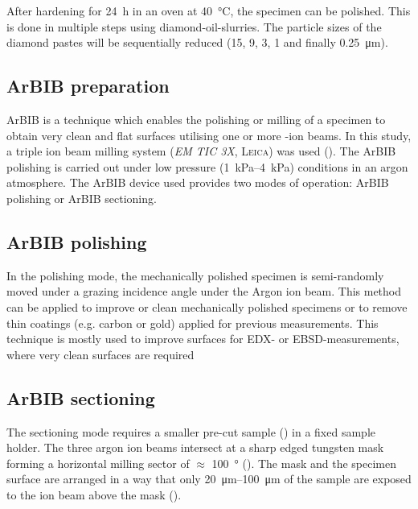 After hardening for \qty{24}{\hour} in an oven at \qty{40}{\celsius}, the specimen can be polished.
This is done in multiple steps using diamond-oil-slurries.
The particle sizes of the diamond pastes will be sequentially reduced (\num{15}, \num{9}, \num{3}, \num{1} and finally \qty{0.25}{\micro\meter}).

\subsection{\Acl*{ArBIB} preparation}

\ac{ArBIB} is a technique which enables the polishing or milling of a specimen to obtain very clean and flat surfaces utilising one or more -ion beams.
In this study, a triple ion beam milling system (\textit{EM TIC 3X}, \textsc{Leica}) was used ().
The \ac{ArBIB} polishing is carried out under low pressure (\qtyrange{1}{4}{\kilo\pascal}) conditions in an argon atmosphere.
The \ac{ArBIB} device used provides two modes of operation: \ac{ArBIB} polishing or \ac{ArBIB} sectioning.

\subsection{\acs*{ArBIB} polishing}
\label{sec:bib_pol_moving}

In the polishing mode, the mechanically polished specimen is semi-randomly moved under a grazing incidence angle under the Argon ion beam.
This method can be applied to improve or clean mechanically polished specimens or to remove thin coatings (e.g. carbon or gold) applied for previous measurements.
This technique is mostly used to improve surfaces for \ac{EDX}- or \ac{EBSD}-measurements, where very clean surfaces are required \cite{rossler.2017,rossler.2022}

\subsection{\acs*{ArBIB} sectioning}
\label{sec:bib_pol_fixed}

The sectioning mode requires a smaller pre-cut sample () in a fixed sample holder.
The three argon ion beams intersect at a sharp edged tungsten mask forming a horizontal milling sector of $\approx$ \qty{100}{\degree} ().
The mask and the specimen surface are arranged in a way that only \qtyrange{20}{100}{\micro\meter} of the sample are exposed to the ion beam above the mask ().

